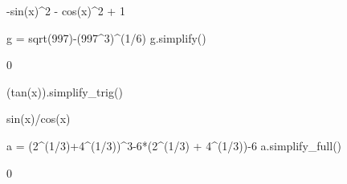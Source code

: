\documentclass[fontsize=12pt,paper=a4,twoside,bibtotoc,idxtotoc,
liststotoc,pagesize,BCOR1.2cm,DIV15,chapterprefix,pagesize=pdftex]{scrbook}
\begin{document}
	  \begin{sage}
	  -sin(x)^2 - cos(x)^2 + 1
	  \end{sage}
     \begin{sagein}
	  g = sqrt(997)-(997^3)^(1/6)
	  g.simplify()
	  \end{sagein}
	  \begin{sage}
	  0
	  \end{sage}
    \begin{sagein}
	(tan(x)).simplify_trig()
	\end{sagein}
	\begin{sage}
	sin(x)/cos(x)
	\end{sage}
    \begin{sagein}
	a = (2^(1/3)+4^(1/3))^3-6*(2^(1/3) + 4^(1/3))-6
	a.simplify_full() 
	\end{sagein}
	\begin{sage}
	0
	\end{sage} 
\end{document}
